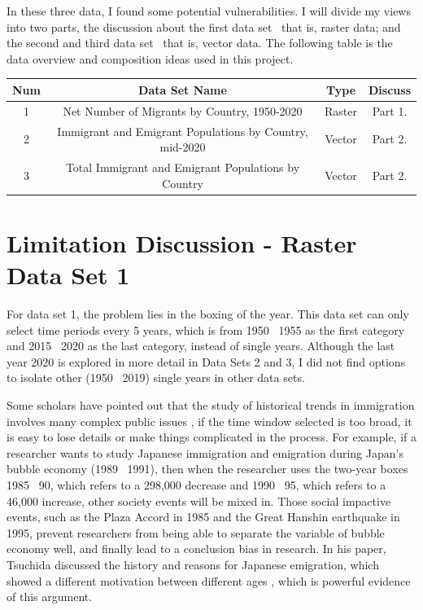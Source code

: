\documentclass[12pt]{article} %
\begin{document}
\noindent In these three data, I found some potential vulnerabilities. I will divide my views into two parts, the discussion about the first data set \textendash\ that is, raster data; and the second and third data set \textemdash\ that is, vector data. The following table is the data overview and composition ideas used in this project.

\begin{center}
		\begin{tabular}[h]{|c|c|c|c|}
			\hline
			Num & Data Set Name & Type & Discuss\\
			\hline
			1 & Net Number of Migrants by Country, 1950-2020 & Raster & Part 1. \\
			\hline
			2 & Immigrant and Emigrant Populations by Country, mid-2020 & Vector & Part 2. \\
			3 & Total Immigrant and Emigrant Populations by Country & Vector & Part 2. \\
			\hline
		\end{tabular}
\end{center}

\newpage

\section*{Limitation Discussion - Raster Data Set 1}

\vspace{.3cm}

\noindent For data set 1, the problem lies in the boxing of the year. This data set can only select time periods every 5 years, which is from 1950 \textendash\ 1955 as the first category and 2015 \textendash\ 2020 as the last category, instead of single years. Although the last year 2020 is explored in more detail in Data Sets 2 and 3, I did not find options to isolate other (1950 \textendash\ 2019) single years in other data sets.

\noindent Some scholars have pointed out that the study of historical trends in immigration involves many complex public issues \citep{lapinski1997trends}, if the time window selected is too broad, it is easy to lose details or make things complicated in the process. For example, if a researcher wants to study Japanese immigration and emigration during Japan's bubble economy (1989 \textendash\ 1991), then when the researcher uses the two-year boxes 1985 \textendash\ 90, which refers to a 298,000 decrease and 1990 \textendash\ 95, which refers to a 46,000 increase, other society events will be mixed in. Those social impactive events, such as the Plaza Accord in 1985 and the Great Hanshin earthquake in 1995, prevent researchers from being able to separate the variable of bubble economy well, and finally lead to a conclusion bias in research. In his paper, Tsuchida discussed the history and reasons for Japanese emigration, which showed a different motivation between different ages \citep{tsuchida1998history}, which is powerful evidence of this argument.
\end{document}
